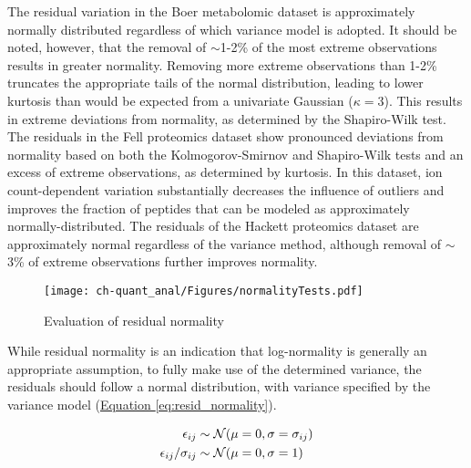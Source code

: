 The residual variation in the Boer metabolomic dataset is approximately normally distributed regardless of which variance model is adopted. It should be noted, however, that the removal of $\sim$1-2\% of the most extreme observations results in greater normality.  Removing more extreme observations than 1-2\% truncates the appropriate tails of the normal distribution, leading to lower kurtosis than would be expected from a univariate Gaussian ($\kappa = 3$). This results in extreme deviations from normality, as determined by the Shapiro-Wilk test. The residuals in the Fell proteomics dataset show pronounced deviations from normality based on both the Kolmogorov-Smirnov and Shapiro-Wilk tests and an excess of extreme observations, as determined by kurtosis. In this dataset, ion count-dependent variation substantially decreases the influence of outliers and improves the fraction of peptides that can be modeled as approximately normally-distributed. The residuals of the Hackett proteomics dataset are approximately normal regardless of the variance method, although removal of $\sim$3\% of extreme observations further improves normality.

\begin{figure}[h!]
\begin{center}
\texttt{[image: ch-quant\_anal/Figures/normalityTests.pdf]}
\caption[Evaluation of residual normality]{Evaluation of residual normality}
\label{ch-quant_anal:normalityTests}
\end{center}
\end{figure}

While residual normality is an indication that log-normality is generally an appropriate assumption, to fully make use of the determined variance, the residuals should follow a normal distribution, with variance specified by the variance model (\hyperref[eq:resid_normality]{Equation \ref{eq:resid_normality}}).

\begin{align}
\epsilon_{ij} &\sim \mathcal{N}(\mu = 0, \sigma = \sigma_{ij})\notag\\
\epsilon_{ij} / \sigma_{ij} &\sim \mathcal{N}(\mu = 0, \sigma = 1)\label{eq:resid_normality}
\end{align}


